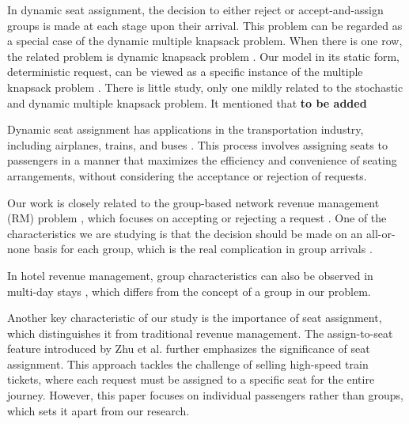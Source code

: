 



In dynamic seat assignment, the decision to either reject or accept-and-assign groups is made at each stage upon their arrival. This problem can be regarded as a special case of the dynamic multiple knapsack problem. When there is one row, the related problem is dynamic knapsack problem \cite{kleywegt1998dynamic}. Our model in its static form, deterministic request, can be viewed as a specific instance of the multiple knapsack problem \cite{pisinger1999exact}. There is little study, only one mildly related to the stochastic and dynamic multiple knapsack problem. It mentioned that {\bf{to be added}}


Dynamic seat assignment has applications in the transportation industry, including airplanes, trains, and buses \cite{hamdouch2011schedule, berge1993demand}. This process involves assigning seats to passengers in a manner that maximizes the efficiency and convenience of seating arrangements, without considering the acceptance or rejection of requests.


Our work is closely related to the group-based network revenue management (RM) problem \cite{williamson1992airline}, which focuses on accepting or rejecting a request \cite{gallego1997multiproduct}. One of the characteristics we are studying is that the decision should be made on an all-or-none basis for each group, which is the real complication in group arrivals \cite{talluri2006theory}. 

In hotel revenue management, group characteristics can also be observed in multi-day stays \cite{aydin2018decomposition, bitran1995application}, which differs from the concept of a group in our problem.

Another key characteristic of our study is the importance of seat assignment, which distinguishes it from traditional revenue management. The assign-to-seat feature introduced by Zhu et al. \cite{zhu2023assign} further emphasizes the significance of seat assignment. This approach tackles the challenge of selling high-speed train tickets, where each request must be assigned to a specific seat for the entire journey. However, this paper focuses on individual passengers rather than groups, which sets it apart from our research.


